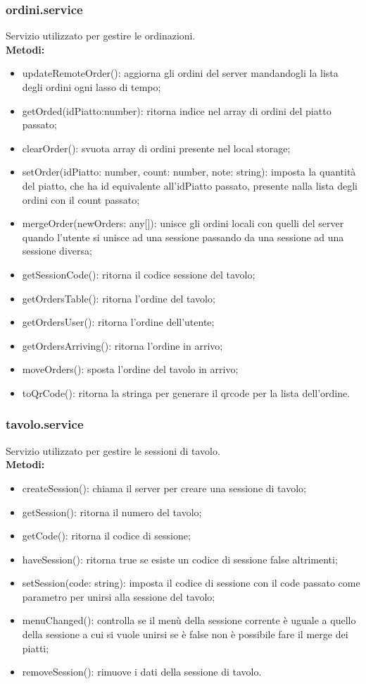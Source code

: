 \subsubsection{ordini.service}
Servizio utilizzato per gestire le ordinazioni.\\
\textbf{Metodi:}
\begin{itemize}
    \item updateRemoteOrder(): aggiorna gli ordini del server mandandogli la lista degli ordini ogni lasso di tempo;
    \item getOrded(idPiatto:number): ritorna indice nel array di ordini del piatto passato;
    \item clearOrder(): svuota array di ordini presente nel local storage;
    \item setOrder(idPiatto: number, count: number, note: string): imposta la quantità del piatto, che ha id equivalente all'idPiatto passato, presente nalla lista degli ordini con il count passato;
    \item mergeOrder(newOrders: any[]): unisce gli ordini locali con quelli del server quando l'utente si unisce ad una sessione passando da una sessione ad una sessione diversa;
    \item getSessionCode(): ritorna il codice sessione del tavolo;
    \item getOrdersTable(): ritorna l'ordine del tavolo;
    \item getOrdersUser(): ritorna l'ordine dell'utente;
    \item getOrdersArriving(): ritorna l'ordine in arrivo;
    \item moveOrders(): sposta l'ordine del tavolo in arrivo;
    \item toQrCode(): ritorna la stringa per generare il qrcode per la lista dell'ordine.
\end{itemize}

\subsubsection{tavolo.service}
Servizio utilizzato per gestire le sessioni di tavolo.\\
\textbf{Metodi:}
\begin{itemize}
    \item createSession(): chiama il server per creare una sessione di tavolo;
    \item getSession(): ritorna il numero del tavolo;
    \item getCode(): ritorna il codice di sessione;
    \item haveSession(): ritorna true se esiste un codice di sessione false altrimenti;
    \item setSession(code: string): imposta il codice di sessione con il code passato come parametro per unirsi alla sessione del tavolo;
    \item menuChanged(): controlla se il menù della sessione corrente è uguale a quello della sessione a cui si vuole unirsi se è false non è possibile fare il merge dei piatti;
    \item removeSession(): rimuove i dati della sessione di tavolo.
\end{itemize}


